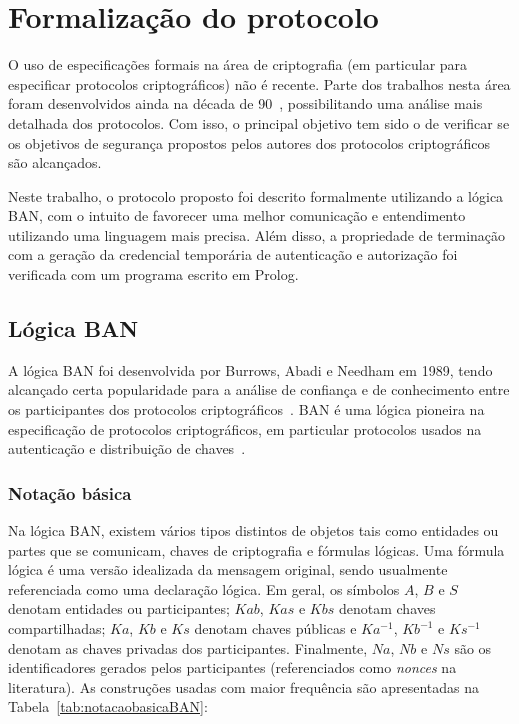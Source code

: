 \section{Formalização do protocolo}

O uso de especificações formais na área de criptografia (em particular para especificar protocolos criptográficos)
não é recente. Parte dos trabalhos nesta área foram desenvolvidos ainda na década de 90~\cite{Meadows95}, possibilitando uma análise mais detalhada dos protocolos. Com isso, o principal objetivo tem sido o de verificar se os objetivos de segurança propostos pelos autores dos protocolos criptográficos são alcançados.

Neste trabalho, o protocolo proposto foi descrito formalmente utilizando a lógica BAN, com o intuito de favorecer uma melhor comunicação e entendimento utilizando uma linguagem mais precisa. Além disso, a propriedade de terminação com a geração da credencial temporária de autenticação e autorização foi verificada com um programa escrito em Prolog.

\subsection{Lógica BAN}

A lógica BAN foi desenvolvida por Burrows, Abadi e Needham em 1989, tendo alcançado certa popularidade para a análise de confiança e de conhecimento entre os participantes dos protocolos criptográficos~\cite{Burrows1990}. BAN é uma lógica pioneira na especificação de protocolos criptográficos, em particular protocolos usados na autenticação e
distribuição de chaves~\cite{Burrows1990}.

\subsubsection{Notação básica}

Na lógica BAN, existem vários tipos distintos de objetos tais como entidades ou partes que se comunicam, chaves de criptografia e fórmulas lógicas. Uma fórmula lógica é uma versão idealizada da mensagem original, sendo usualmente referenciada como uma declaração lógica. Em geral, os símbolos $A$, $B$ e $S$ denotam entidades ou participantes; $Kab$, $Kas$ e $Kbs$ denotam chaves compartilhadas; $Ka$, $Kb$ e $Ks$ denotam chaves públicas e $Ka^{-1}$, $Kb^{-1}$ e $Ks^{-1}$ denotam as chaves privadas dos participantes.
Finalmente, $Na$, $Nb$ e $Ns$ são os identificadores gerados pelos participantes (referenciados como \emph{nonces}
na literatura). As construções usadas com maior frequência são apresentadas na Tabela~\ref{tab:notacaobasicaBAN}:

